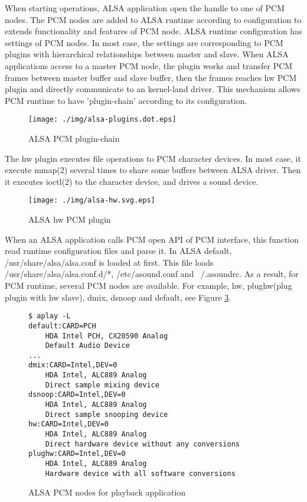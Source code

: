 \documentclass[onecolumn]{article}
\begin{document}
When starting operations, ALSA application open the handle to one of PCM nodes. The PCM nodes are added to ALSA runtime according to configuration to extends functionality and features of PCM node. ALSA runtime configuration has settings of PCM nodes. In most case, the settings are corresponding to PCM plugins with hierarchical relationships between master and slave. When ALSA applications access to a master PCM node, the plugin works and transfer PCM frames between master buffer and slave buffer, then the frames reaches hw PCM plugin and directly communicate to an kernel-land driver. This mechanism allows PCM runtime to have 'plugin-chain' according to its configuration. 

\begin{figure}[htbp]
	\centering
	\texttt{[image: ./img/alsa-plugins.dot.eps]}
	\caption{{ALSA PCM plugin-chain}}
	\label{alsa_plugins}
\end{figure}

The hw plugin executes file operations to PCM character devices. In most case, it execute mmap(2) several times to share some buffers between ALSA driver. Then it executes ioctl(2) to the character device, and drives a sound device.

\begin{figure}[htbp]
	\centering
	\texttt{[image: ./img/alsa-hw.svg.eps]}
	\caption{{ALSA hw PCM plugin}}
	\label{fig:alsa-hw-plugin}
\end{figure}

When an ALSA application calls PCM open API of PCM interface, this function read runtime configuration files and parse it. In ALSA default, /usr/share/alsa/alsa.conf is loaded at first. This file loads /usr/share/alsa/alsa.conf.d/*, /etc/asound.conf and ~/.asoundrc. As a result, for PCM runtime, several PCM nodes are available. For example, hw, plughw(plug plugin with hw slave), dmix, dsnoop and default, see Figure \ref{pcm-nodes-playback}.

\begin{figure}[htbp]
\small
\begin{verbatim}
$ aplay -L
default:CARD=PCH
    HDA Intel PCH, CX20590 Analog
    Default Audio Device
...
dmix:CARD=Intel,DEV=0
    HDA Intel, ALC889 Analog
    Direct sample mixing device
dsnoop:CARD=Intel,DEV=0
    HDA Intel, ALC889 Analog
    Direct sample snooping device
hw:CARD=Intel,DEV=0
    HDA Intel, ALC889 Analog
    Direct hardware device without any conversions
plughw:CARD=Intel,DEV=0
    HDA Intel, ALC889 Analog
    Hardware device with all software conversions
\end{verbatim}
\caption{ALSA PCM nodes for playback application}
\label{pcm-nodes-playback}
\end{figure}
\end{document}
